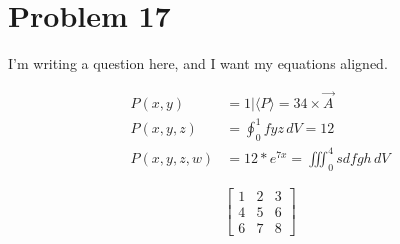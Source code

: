 \documentclass{paper}
\begin{document}
\section*{Problem 17}
I'm writing a question here, and I want my equations aligned.

\begin{align*}
	P(x,y)&=1|\langle P \rangle = 34\times\vec A\\
	P(x,y,z)&= \oint_0^1 fyz\,dV = 12\\
	P(x,y,z,w) &= 12*e^{7x} = \iiint_0^4 sdfgh\,dV
\end{align*}

\newcommand{\mymatrix}[9]{\begin{bmatrix}#1&#2&#3\\#4&#5&#6\\#6&#7&#8\end{bmatrix}}

$$\mymatrix{1}{2}{3}{4}{5}{6}{7}{8}{9}$$
\end{document}
